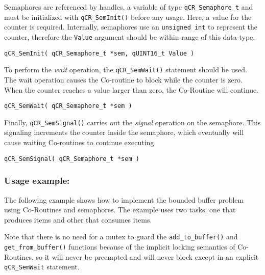 Semaphores are referenced by handles, a variable of type \lstinline{qCR_Semaphore_t} and must be initialized with \lstinline{qCR_SemInit()}  before any usage.  Here, a value for the counter is required. Internally, semaphores use an \lstinline{unsigned int} to represent the counter, therefore the \lstinline{Value} argument should be within range of this data-type.
\medskip

\begin{lstlisting}[style=CStyle]
qCR_SemInit( qCR_Semaphore_t *sem, qUINT16_t Value )
\end{lstlisting}

To perform the \textit{wait} operation, the \lstinline{qCR_SemWait()}  statement should be used. The wait operation causes the Co-routine to block while the counter is zero. When the counter reaches a value larger than zero, the Co-Routine will continue.
\medskip


\begin{lstlisting}[style=CStyle]
qCR_SemWait( qCR_Semaphore_t *sem )
\end{lstlisting}

Finally, \lstinline{qCR_SemSignal()}  carries out the \textit{signal} operation on the semaphore. This signaling increments the counter inside the semaphore, which eventually will cause waiting Co-routines to continue executing.
\medskip

\begin{lstlisting}[style=CStyle]
qCR_SemSignal( qCR_Semaphore_t *sem )
\end{lstlisting}


\subsubsection*{Usage example:}
The following example shows how to implement the bounded buffer problem using Co-Routines and semaphores. The example uses two tasks: one that produces items and other that consumes items.

Note that there is no need for a mutex to guard the \lstinline{add_to_buffer()} and \lstinline{get_from_buffer()} functions because of the implicit locking semantics of Co-Routines, so it will never be preempted and will never block except in an explicit \lstinline{qCR_SemWait} statement.
\medskip



